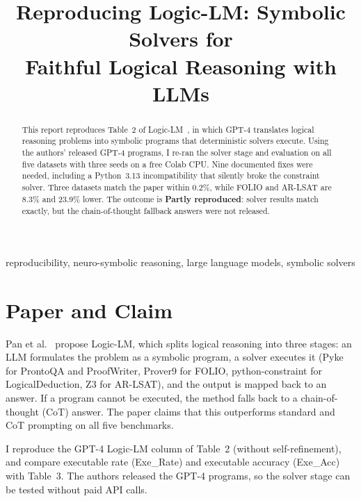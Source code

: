 \documentclass[conference]{IEEEtran}
\begin{document}
\title{Reproducing Logic-LM: Symbolic Solvers for\\Faithful Logical Reasoning with LLMs}

\author{
}

\maketitle

\begin{abstract}
This report reproduces Table~2 of Logic-LM~\cite{pan2023logiclm}, in which
GPT-4 translates logical reasoning problems into symbolic programs that
deterministic solvers execute. Using the authors' released GPT-4 programs, I
re-ran the solver stage and evaluation on all five datasets with three seeds on
a free Colab CPU. Nine documented fixes were needed, including a Python~3.13
incompatibility that silently broke the constraint solver. Three datasets match
the paper within 0.2\%, while FOLIO and AR-LSAT are 8.3\% and 23.9\% lower. The
outcome is \textbf{Partly reproduced}: solver results match exactly, but the
chain-of-thought fallback answers were not released.
\end{abstract}

\begin{IEEEkeywords}
reproducibility, neuro-symbolic reasoning, large language models, symbolic solvers
\end{IEEEkeywords}

\section{Paper and Claim}
Pan et al.~\cite{pan2023logiclm} propose Logic-LM, which splits logical
reasoning into three stages: an LLM formulates the problem as a symbolic
program, a solver executes it (Pyke for ProntoQA and ProofWriter, Prover9 for
FOLIO, python-constraint for LogicalDeduction, Z3 for AR-LSAT), and the output
is mapped back to an answer. If a program cannot be executed, the method falls
back to a chain-of-thought (CoT) answer. The paper claims that this
outperforms standard and CoT prompting on all five benchmarks.

I reproduce the GPT-4 Logic-LM column of Table~2 (without self-refinement), and
compare executable rate (Exe\_Rate) and executable accuracy (Exe\_Acc) with
Table~3. The authors released the GPT-4 programs, so the solver stage can be
tested without paid API calls.
\end{document}
